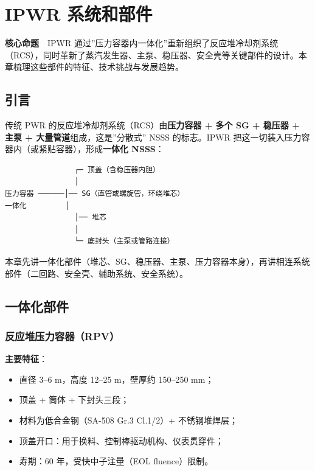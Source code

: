 \documentclass[
  UTF8,
  scheme=plain,
  fontsize=10pt,
  openany
]{ctexbook}
\begin{document}
\cleardoublepage

\chapter{IPWR 系统和部件}\label{ipwr-ux7cfbux7edfux548cux90e8ux4ef6}

\begin{epigraph}

\textbf{核心命题}　IPWR
通过''压力容器内一体化''重新组织了反应堆冷却剂系统（RCS），同时革新了蒸汽发生器、主泵、稳压器、安全壳等关键部件的设计。本章梳理这些部件的特征、技术挑战与发展趋势。

\end{epigraph}

\section{引言}\label{ux5f15ux8a00-4}

传统 PWR 的反应堆冷却剂系统（RCS）由\textbf{压力容器 + 多个 SG + 稳压器
+ 主泵 + 大量管道}组成，这是''分散式'' NSSS 的标志。IPWR
把这一切装入压力容器内（或紧贴容器），形成\textbf{一体化 NSSS}：

\begin{verbatim}                ┌─ 顶盖（含稳压器内胆）
                │
压力容器 ──────│── SG（直管或螺旋管，环绕堆芯）
一体化         │  
                │── 堆芯
                │
                └─ 底封头（主泵或管路连接）\end{verbatim}

本章先讲一体化部件（堆芯、SG、稳压器、主泵、压力容器本身），再讲相连系统部件（二回路、安全壳、辅助系统、安全系统）。

\section{一体化部件}\label{ux4e00ux4f53ux5316ux90e8ux4ef6}

\subsection{反应堆压力容器（RPV）}\label{ux53cdux5e94ux5806ux538bux529bux5bb9ux5668rpv}

\textbf{主要特征}：

\begin{itemize}
\tightlist
\item
  直径 3--6 m，高度 12--25 m，壁厚约 150--250 mm；
\item
  顶盖 + 筒体 + 下封头三段；
\item
  材料为低合金钢（SA-508 Gr.3 Cl.1/2）+ 不锈钢堆焊层；
\item
  顶盖开口：用于换料、控制棒驱动机构、仪表贯穿件；
\item
  寿期：60 年，受快中子注量（EOL fluence）限制。
\end{itemize}
\end{document}
